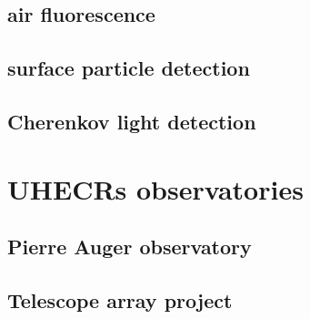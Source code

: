 \subsection{air fluorescence}

\subsection{surface particle detection}

\subsection{Cherenkov light detection}


\section{UHECRs observatories}
\subsection{Pierre Auger observatory}

\subsection{Telescope array project}
